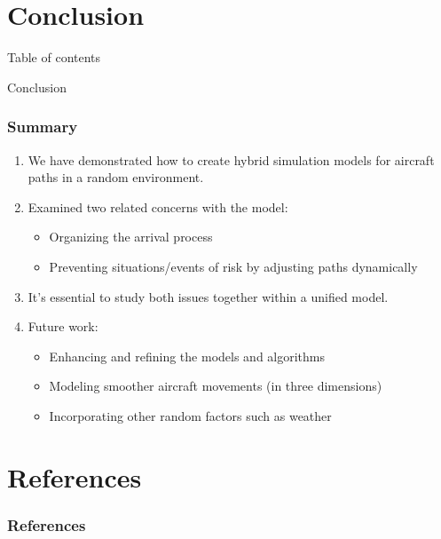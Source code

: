 \documentclass[UKenglish]{beamer}
\begin{document}
\section{Conclusion}
\begin{frame}[allowframebreaks]{Table of contents}
    \tableofcontents[currentsection,hideothersubsections, subsubsectionstyle=show/show/show/hide]   
\end{frame}
\begin{frame}{Conclusion}
\frametitle{Summary}
\begin{enumerate}
    \item We have demonstrated how to create hybrid simulation models for aircraft paths in a random environment.
    \item Examined two related concerns with the model:
    \begin{itemize}
        \item Organizing the arrival process
        \item Preventing situations/events of risk by adjusting paths dynamically
    \end{itemize}
    \item It's essential to study both issues together within a unified model.
    \item Future work:
    \begin{itemize}
        \item Enhancing and refining the models and algorithms
        \item Modeling smoother aircraft movements (in three dimensions)
        \item Incorporating other random factors such as weather
    \end{itemize}
\end{enumerate}
\end{frame}
\section{References}


\begin{frame}[allowframebreaks]
\frametitle{References}
\nocite{*}

\end{frame}
\end{document}
